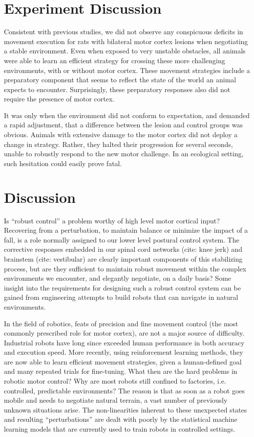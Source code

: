 \section{Experiment Discussion}

Consistent with previous studies, we did not observe any conspicuous deficits in movement execution for rats with bilateral motor cortex lesions when negotiating a stable environment. Even when exposed to very unstable obstacles, all animals were able to learn an efficient strategy for crossing these more challenging environments, with or without motor cortex. These movement strategies include a preparatory component that seems to reflect the state of the world an animal expects to encounter. Surprisingly, these preparatory responses also did not require the presence of motor cortex.

It was only when the environment did not conform to expectation, and demanded a rapid adjustment, that a difference between the lesion and control groups was obvious. Animals with extensive damage to the motor cortex did not deploy a change in strategy. Rather, they halted their progression for several seconds, unable to robustly respond to the new motor challenge. In an ecological setting, such hesitation could easily prove fatal.

\section{Discussion}

Is “robust control” a problem worthy of high level motor cortical input? Recovering from a perturbation, to maintain balance or minimize the impact of a fall, is a role normally assigned to our lower level postural control system. The corrective responses embedded in our spinal cord networks (cite: knee jerk) and brainstem (cite: vestibular) are clearly important components of this stabilizing process, but are they sufficient to maintain robust movement within the complex environments we encounter, and elegantly negotiate, on a daily basis? Some insight into the requirements for designing such a robust control system can be gained from engineering attempts to build robots that can navigate in natural environments.

In the field of robotics, feats of precision and fine movement control (the most commonly prescribed role for motor cortex), are not a major source of difficulty. Industrial robots have long since exceeded human performance in both accuracy and execution speed. More recently, using reinforcement learning methods, they are now able to learn efficient movement strategies, given a human-defined goal and many repeated trials for fine-tuning. What then are the hard problems in robotic motor control? Why are most robots still confined to factories, i.e. controlled, predictable environments? The reason is that as soon as a robot goes mobile and needs to negotiate natural terrain, a vast number of previously unknown situations arise. The non-linearities inherent to these unexpected states and resulting “perturbations” are dealt with poorly by the statistical machine learning models that are currently used to train robots in controlled settings.

